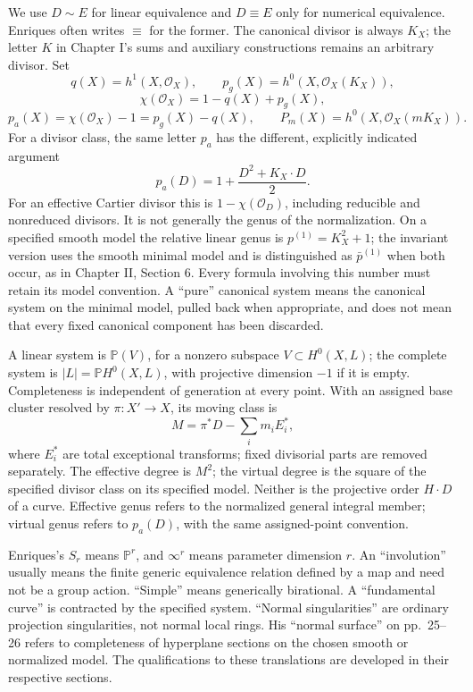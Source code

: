 We use \(D\sim E\) for linear equivalence and \(D\equiv E\) only for numerical equivalence. Enriques often writes \(\equiv\) for the former. The canonical divisor is always \(K_X\); the letter \(K\) in Chapter I's sums and auxiliary constructions remains an arbitrary divisor. Set \[
q(X)=h^1(X,\mathcal O_X),\qquad
p_g(X)=h^0(X,\mathcal O_X(K_X)),
\] \[
\chi(\mathcal O_X)=1-q(X)+p_g(X),
\] \[
p_a(X)=\chi(\mathcal O_X)-1=p_g(X)-q(X),\qquad
P_m(X)=h^0(X,\mathcal O_X(mK_X)).
\] For a divisor class, the same letter \(p_a\) has the different, explicitly indicated argument \[
p_a(D)=1+\frac{D^2+K_X\cdot D}{2}.
\] For an effective Cartier divisor this is \(1-\chi(\mathcal O_D)\), including reducible and nonreduced divisors. It is not generally the genus of the normalization. On a specified smooth model the relative linear genus is \(p^{(1)}=K_X^2+1\); the invariant version uses the smooth minimal model and is distinguished as \(\bar p^{(1)}\) when both occur, as in Chapter II, Section 6. Every formula involving this number must retain its model convention. A ``pure'' canonical system means the canonical system on the minimal model, pulled back when appropriate, and does not mean that every fixed canonical component has been discarded.

A linear system is \(\mathbb P(V)\), for a nonzero subspace \(V\subset H^0(X,L)\); the complete system is \(|L|=\mathbb P H^0(X,L)\), with projective dimension \(-1\) if it is empty. Completeness is independent of generation at every point. With an assigned base cluster resolved by \(\pi:X'\to X\), its moving class is \[
M=\pi^*D-\sum_i m_iE_i^*,
\] where \(E_i^*\) are total exceptional transforms; fixed divisorial parts are removed separately. The effective degree is \(M^2\); the virtual degree is the square of the specified divisor class on its specified model. Neither is the projective order \(H\cdot D\) of a curve. Effective genus refers to the normalized general integral member; virtual genus refers to \(p_a(D)\), with the same assigned-point convention.

Enriques's \(S_r\) means \(\mathbb P^r\), and \(\infty^r\) means parameter dimension \(r\). An ``involution'' usually means the finite generic equivalence relation defined by a map and need not be a group action. ``Simple'' means generically birational. A ``fundamental curve'' is contracted by the specified system. ``Normal singularities'' are ordinary projection singularities, not normal local rings. His ``normal surface'' on pp.~25--26 refers to completeness of hyperplane sections on the chosen smooth or normalized model. The qualifications to these translations are developed in their respective sections.

